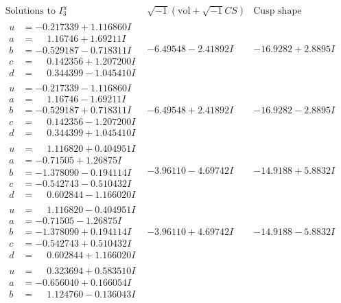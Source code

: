 \documentclass[1p]{elsarticle_modified}
\theoremstyle{definition}
\newcommand{\I}{\sqrt{-1}}
\begin{document}
$$\begin{array}{c|c|c}  
\text{Solutions to }I^u_{3}& \I (\text{vol} + \sqrt{-1}CS) & \text{Cusp shape}\\
 \hline 
\begin{aligned}
u &= -0.217339 + 1.116860 I \\
a &= \phantom{-}1.16746 + 1.69211 I \\
b &= -0.529187 - 0.718311 I \\
c &= \phantom{-}0.142356 + 1.207200 I \\
d &= \phantom{-}0.344399 - 1.045410 I\end{aligned}
 & -6.49548 - 2.41892 I & -16.9282 + 2.8895 I \\ \hline\begin{aligned}
u &= -0.217339 - 1.116860 I \\
a &= \phantom{-}1.16746 - 1.69211 I \\
b &= -0.529187 + 0.718311 I \\
c &= \phantom{-}0.142356 - 1.207200 I \\
d &= \phantom{-}0.344399 + 1.045410 I\end{aligned}
 & -6.49548 + 2.41892 I & -16.9282 - 2.8895 I \\ \hline\begin{aligned}
u &= \phantom{-}1.116820 + 0.404951 I \\
a &= -0.71505 + 1.26875 I \\
b &= -1.378090 - 0.194114 I \\
c &= -0.542743 - 0.510432 I \\
d &= \phantom{-}0.602844 - 1.166020 I\end{aligned}
 & -3.96110 - 4.69742 I & -14.9188 + 5.8832 I \\ \hline\begin{aligned}
u &= \phantom{-}1.116820 - 0.404951 I \\
a &= -0.71505 - 1.26875 I \\
b &= -1.378090 + 0.194114 I \\
c &= -0.542743 + 0.510432 I \\
d &= \phantom{-}0.602844 + 1.166020 I\end{aligned}
 & -3.96110 + 4.69742 I & -14.9188 - 5.8832 I \\ \hline\begin{aligned}
u &= \phantom{-}0.323694 + 0.583510 I \\
a &= -0.656040 + 0.166054 I \\
b &= \phantom{-}1.124760 - 0.136043 I \\

\end{aligned}
\end{array}$$
\end{document}
